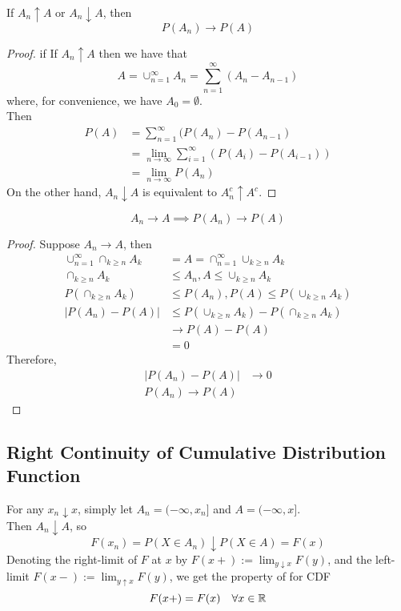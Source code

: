 \documentclass[11pt]{article}
\numberwithin{equation}{section}
\begin{document}
\proposition
If $A_n \uparrow A$ or $A_n \downarrow A$, then
$$P(A_n) \rightarrow P(A)$$
\begin{proof}
	if If $A_n \uparrow A$ then we have that 
	$$ A = \cup_{n=1}^\infty A_n = \sum_{n=1}^\infty (A_n - A_{n-1})$$
	where, for convenience, we have $A_0 = \emptyset$. \\
	Then
	\begin{align*}
		P(A) &= \sum_{n=1}^\infty (P(A_n) - P(A_{n-1}) \\
		&= \lim_{n \rightarrow \infty}\sum_{i=1}^\infty (P(A_i) - P(A_{i-1})) \\
		&= \lim_{n \rightarrow \infty} P(A_n)
	\end{align*}
	On the other hand, $A_n \downarrow A$ is equivalent to $A_n^c \uparrow A^c$.
\end{proof}

\begin{equation}
	A_n \rightarrow A \implies P(A_n) \rightarrow P(A)
\end{equation}
\begin{proof}
	Suppose $A_n \rightarrow A$, then
	\begin{align*}
		\cup_{n=1}^\infty\cap_{k\geq n}A_k &= A = \cap_{n=1}^\infty\cup_{k\geq n}A_k \\
		\cap_{k\geq n}A_k &\leq A_n, A \leq \cup_{k\geq n}A_k \\
		P(\cap_{k\geq n}A_k) &\leq P(A_n), P(A) \leq P(\cup_{k\geq n}A_k) \\
		|P(A_n) - P(A)| & \leq P(\cup_{k\geq n}A_k) - P(\cap_{k\geq n}A_k) \\
		& \rightarrow P(A) - P(A) \\
		&= 0
	\end{align*}
	Therefore, 
	\begin{align*}
		|P(A_n) - P(A)| &\rightarrow 0 \\
		P(A_n) \rightarrow P(A)
	\end{align*}
\end{proof}

\subsection{Right Continuity of Cumulative Distribution Function}
For any $x_n \downarrow x$, simply let $A_n = (-\infty, x_n]$ and $A=(-\infty, x]$. \\
Then $A_n \downarrow A$, so 
$$F(x_n) = P(X \in A_n) \downarrow P(X \in A) = F(x)$$
Denoting the right-limit of $F$ at $x$ by $F(x+) := \lim_{y\downarrow x}F(y)$, and the left-limit $F(x-) := \lim_{y\uparrow x}F(y)$, we get the property of  for CDF
\begin{equation}
	F(x+) = F(x) \quad \forall x \in \mathbb{R}
\end{equation}
\end{document}
